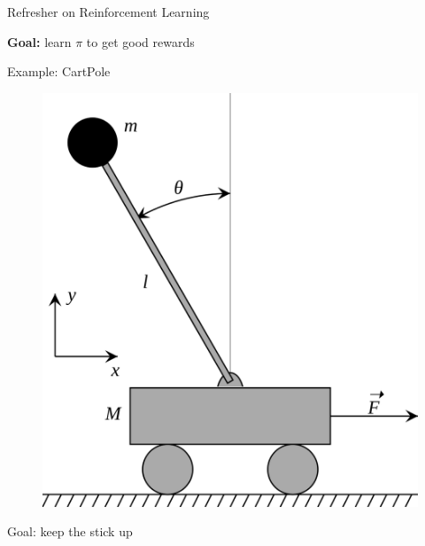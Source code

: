 \documentclass[12pt,aspectratio=169]{beamer}
\begin{document}
\begin{frame}{Refresher on Reinforcement Learning}
\begin{minipage}{0.3\linewidth}
{\begin{tikzpicture}[->,>=stealth',auto,node distance=3cm,
        thick,main node/.style={circle,draw,font=\sffamily\Large\bfseries}]
      \end{tikzpicture}
    }
  \end{minipage}

  \begin{center} \large
    \textbf{\textcolor{amaranth}{Goal:}} learn $\pi$ to get good rewards
  \end{center}

\end{frame}


\begin{frame}{Example: CartPole}
  \qquad
  \begin{minipage}[t]{0.3\linewidth}
    
  \begin{figure}
    \centering
    \includegraphics[width=\linewidth]{images/cart-pole.png}
    \label{fig:enter-label}
  \end{figure}

  \end{minipage}\qquad\quad
  \begin{minipage}[t]{0.5\linewidth}

    \vspace{3em}

    Goal: keep the stick up


\end{minipage}
\end{frame}
\end{document}

